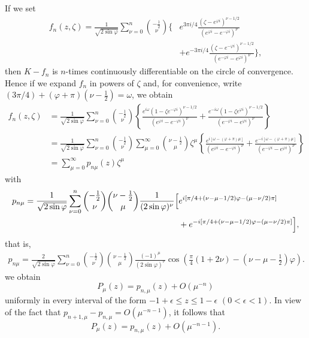 If we set
\[
\begin{aligned}
f_n(z,\zeta)=\frac1{\sqrt{2\sin\varphi}}\sum_{\nu=0}^n\binom{-\tfrac12}{\nu}
\Biggl\{&e^{3\pi i/4}\frac{(\zeta-e^{\varphi i})^{\nu-1/2}}{(e^{\varphi i}-e^{-\varphi i})^\nu}\\
&+e^{-3\pi i/4}\frac{(\zeta-e^{-\varphi i})^{\nu-1/2}}{(e^{-\varphi i}-e^{\varphi i})^\nu}\Biggr\},
\end{aligned}
\]
then $K-f_n$ is $n$-times continuously differentiable on the circle of convergence. Hence if we expand $f_n$ in powers of $\zeta$ and, for convenience, write
$(3\pi/4)+(\varphi+\pi)(\nu-\tfrac12)=\omega$, we obtain
\begin{align*}
f_n(z,\zeta)
&=\frac1{\sqrt{2\sin\varphi}}\sum_{\nu=0}^n\binom{-\tfrac12}{\nu}
\left\{\frac{e^{i\omega}(1-\zeta e^{-\varphi i})^{\nu-1/2}}{(e^{\varphi i}-e^{-\varphi i})^\nu}
+\frac{e^{-i\omega}(1-\zeta e^{\varphi i})^{\nu-1/2}}{(e^{-\varphi i}-e^{\varphi i})^\nu}\right\}\\
&=\frac1{\sqrt{2\sin\varphi}}\sum_{\nu=0}^n\binom{-\tfrac12}{\nu}
\sum_{\mu=0}^\infty\binom{\nu-\tfrac12}{\mu}\zeta^\mu
\left\{\frac{e^{i[\omega-(\varphi+\pi)\mu]}}{(e^{\varphi i}-e^{-\varphi i})^\nu}
+\frac{e^{-i[\omega-(\varphi+\pi)\mu]}}{(e^{-\varphi i}-e^{\varphi i})^\nu}\right\}\\
&=\sum_{\mu=0}^\infty p_{n\mu}(z)\zeta^\mu
\end{align*}
with
\[
\begin{aligned}
p_{n\mu}=\frac1{\sqrt{2\sin\varphi}}\sum_{\nu=0}^n
\binom{-\tfrac12}{\nu}\binom{\nu-\tfrac12}{\mu}\frac1{(2\sin\varphi)^\nu}
\Bigl[&e^{i[\pi/4+(\nu-\mu-1/2)\varphi-(\mu-\nu/2)\pi]}\\
&+e^{-i[\pi/4+(\nu-\mu-1/2)\varphi-(\mu-\nu/2)\pi]}\Bigr],
\end{aligned}
\]
that is,
\begin{equation}\tag{98}
\begin{aligned}
p_{n\mu}=\frac{2}{\sqrt{2\sin\varphi}}\sum_{\nu=0}^n
\binom{-\tfrac12}{\nu}\binom{\nu-\tfrac12}{\mu}
\frac{(-1)^\mu}{(2\sin\varphi)^\nu}
\cos\left(\frac\pi4(1+2\nu)-(\nu-\mu-\tfrac12)\varphi\right).
\end{aligned}
\end{equation}
we obtain
\[
P_\mu(z)=p_{n,\mu}(z)+O(\mu^{-n})
\]
uniformly in every interval of the form $-1+\epsilon\le z\le1-\epsilon$ $(0<\epsilon<1)$. In view of the fact that $p_{n+1,\mu}-p_{n,\mu}=O(\mu^{-n-1})$, it follows that
\[
P_\mu(z)=p_{n,\mu}(z)+O(\mu^{-n-1}).
\]

